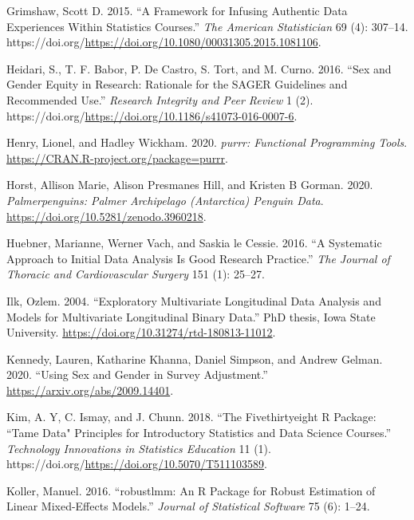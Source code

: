 \documentclass[12pt]{article}
\newlength{\cslhangindent}
\newlength{\cslentryspacingunit} %
\newenvironment{CSLReferences}[2] %
 {%
  \setlength{\parindent}{0pt}
  \ifodd #1
  \let\oldpar\par
  \def\par{\hangindent=\cslhangindent\oldpar}
  \fi
  \setlength{\parskip}{#2\cslentryspacingunit}
 }%
 {}
\begin{document}
\begin{CSLReferences}{1}{0}
\leavevmode{}%
Grimshaw, Scott D. 2015. {``A Framework for Infusing Authentic Data Experiences Within Statistics Courses.''} \emph{The American Statistician} 69 (4): 307--14. https://doi.org/\url{https://doi.org/10.1080/00031305.2015.1081106}.

\leavevmode{}%
Heidari, S., T. F. Babor, P. De Castro, S. Tort, and M. Curno. 2016. {``Sex and Gender Equity in Research: Rationale for the {SAGER} Guidelines and Recommended Use.''} \emph{Research Integrity and Peer Review} 1 (2). https://doi.org/\url{https://doi.org/10.1186/s41073-016-0007-6}.

\leavevmode{}%
Henry, Lionel, and Hadley Wickham. 2020. \emph{{purrr: Functional Programming Tools}}. \url{https://CRAN.R-project.org/package=purrr}.

\leavevmode{}%
Horst, Allison Marie, Alison Presmanes Hill, and Kristen B Gorman. 2020. \emph{Palmerpenguins: Palmer Archipelago (Antarctica) Penguin Data}. \url{https://doi.org/10.5281/zenodo.3960218}.

\leavevmode{}%
Huebner, Marianne, Werner Vach, and Saskia le Cessie. 2016. {``A Systematic Approach to Initial Data Analysis Is Good Research Practice.''} \emph{The Journal of Thoracic and Cardiovascular Surgery} 151 (1): 25--27.

\leavevmode{}%
Ilk, Ozlem. 2004. {``Exploratory Multivariate Longitudinal Data Analysis and Models for Multivariate Longitudinal Binary Data.''} PhD thesis, Iowa State University. \url{https://doi.org/10.31274/rtd-180813-11012}.

\leavevmode{}%
Kennedy, Lauren, Katharine Khanna, Daniel Simpson, and Andrew Gelman. 2020. {``Using Sex and Gender in Survey Adjustment.''} \url{https://arxiv.org/abs/2009.14401}.

\leavevmode{}%
Kim, A. Y, C. Ismay, and J. Chunn. 2018. {``The Fivethirtyeight {R} Package: ``Tame Data" Principles for Introductory Statistics and Data Science Courses.''} \emph{Technology Innovations in Statistics Education} 11 (1). https://doi.org/\url{https://doi.org/10.5070/T511103589}.

\leavevmode{}%
Koller, Manuel. 2016. {``{robustlmm: An R Package for Robust Estimation of Linear Mixed-Effects Models}.''} \emph{Journal of Statistical Software} 75 (6): 1--24.


\end{CSLReferences}
\end{document}
